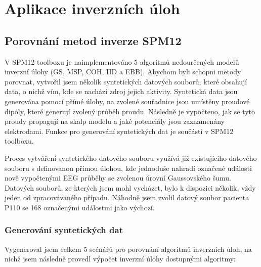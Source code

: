 
\chapter{Aplikace inverzních úloh}

\section{Porovnání metod inverze SPM12}
V SPM12 toolboxu je naimplementováno 5 algoritmů nedourčených modelů inverzní úlohy (GS, MSP, COH, IID a EBB). Abychom byli schopni metody porovnat, vytvořil jsem několik syntetických datových souborů, které obsahují data, o nichž vím, kde se nachází zdroj jejich aktivity. Syntetická data jsou generována pomocí přímé úlohy, na zvolené souřadnice jsou umístěny proudové dipóly, které generují zvolený průběh proudu. Následně je vypočteno, jak se tyto proudy propagují na skalp modelu a jaké potenciály jsou zaznamenány elektrodami. Funkce pro generování syntetických dat je součástí v SPM12 toolboxu. 

Proces vytváření syntetického datového souboru využívá již existujícího datového souboru s definovanou přímou úlohou, kde jednoduše nahradí označené události nově vypočtenými EEG průběhy se zvolenou úrovní Gaussovského šumu. Datových souborů, ze kterých jsem mohl vycházet, bylo k dispozici několik, vždy jeden od zpracovávaného případu. Náhodně jsem zvolil datový soubor pacienta P110 se 168 označenými událostmi jako výchozí. 

\subsection{Generování syntetických dat}
Vygeneroval jsem celkem 5 scénářů pro porovnání algoritmů inverzních úloh, na nichž jsem následně provedl výpočet inverzní úlohy dostupnými algoritmy:

